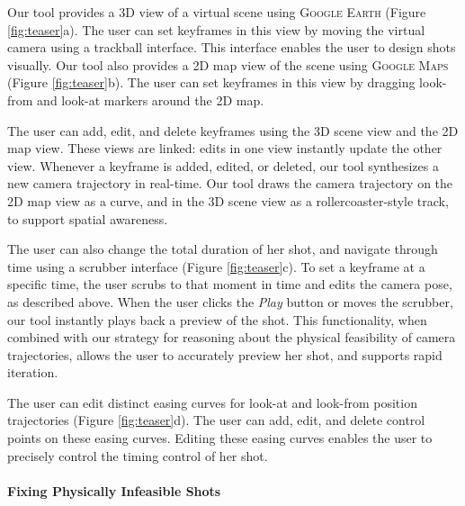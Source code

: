 Our tool provides a 3D view of a virtual scene using \textsc{Google Earth} (Figure \ref{fig:teaser}a).
The user can set keyframes in this view by moving the virtual camera using a trackball interface.
This interface enables the user to design shots visually.
Our tool also provides a 2D map view of the scene using \textsc{Google Maps} (Figure \ref{fig:teaser}b).
The user can set keyframes in this view by dragging look-from and look-at markers around the 2D map.

The user can add, edit, and delete keyframes using the 3D scene view and the 2D map view.
These views are linked: edits in one view instantly update the other view.
Whenever a keyframe is added, edited, or deleted, our tool synthesizes a new camera trajectory in real-time.
Our tool draws the camera trajectory on the 2D map view as a curve, and in the 3D scene view as a rollercoaster-style track, to support spatial awareness.

The user can also change the total duration of her shot, and navigate through time using a scrubber interface (Figure \ref{fig:teaser}c). To set a keyframe at a specific time, the user scrubs to that moment in time and edits the camera pose, as described above.
When the user clicks the \emph{Play} button or moves the scrubber, our tool instantly plays back a preview of the shot.
This functionality, when combined with our strategy for reasoning about the physical feasibility of camera trajectories, allows the user to accurately preview her shot, and supports rapid iteration.

The user can edit distinct easing curves for look-at and look-from position trajectories (Figure \ref{fig:teaser}d).
The user can add, edit, and delete control points on these easing curves.
Editing these easing curves enables the user to precisely control the timing control of her shot.


\paragraph{Fixing Physically Infeasible Shots}

